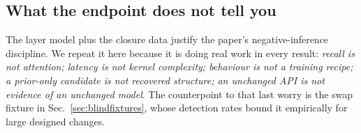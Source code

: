 \subsection{What the endpoint does not tell you}
The layer model plus the closure data justify the paper's negative-inference
discipline.  We repeat it here because it is doing real work in every result:
\emph{recall is not attention; latency is not kernel complexity; behaviour is not a
training recipe; a prior-only candidate is not recovered structure; an unchanged API is
not evidence of an unchanged model}.  The counterpoint to that last worry is the swap
fixture in Sec.~\ref{sec:blindfixtures}, whose detection rates bound it empirically for
large designed changes.
